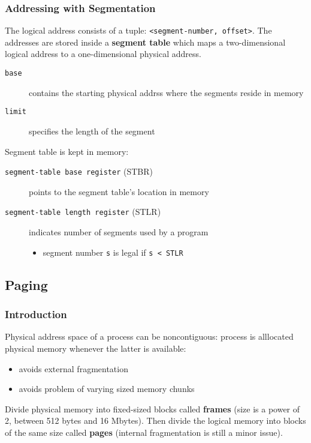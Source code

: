 \documentclass{article}%
\begin{document}
\subsubsection{Addressing with Segmentation}
\label{sec:org93f22d3}
The logical address consists of a tuple: \texttt{<segment-number, offset>}.
The addresses are stored inside a \textbf{segment table} which maps a two-dimensional logical address to a one-dimensional physical address.
\begin{description}
\item[{\texttt{base}}] contains the starting physical addrss where the segments reside in memory
\item[{\texttt{limit}}] specifies the length of the segment
\end{description}
Segment table is kept in memory:
\begin{description}
\item[{\texttt{segment-table base register} (STBR)}] points to the segment table's location in memory
\item[{\texttt{segment-table length register} (STLR)}] indicates number of segments used by a program
\begin{itemize}
\item segment number \texttt{s} is legal if \texttt{s < STLR}
\end{itemize}
\end{description}

\subsection{Paging}
\label{sec:org213e9a5}
\subsubsection{Introduction}
\label{sec:org2537079}
Physical address space of a process can be noncontiguous: process is alllocated physical memory whenever the latter is available:
\begin{itemize}
\item avoids external fragmentation
\item avoids problem of varying sized memory chunks
\end{itemize}
Divide physical memory into fixed-sized blocks called \textbf{frames} (size is a power of 2, between 512 bytes and 16 Mbytes).
Then divide the logical memory into blocks of the same size called \textbf{pages} (internal fragmentation is still a minor issue).
\end{document}
